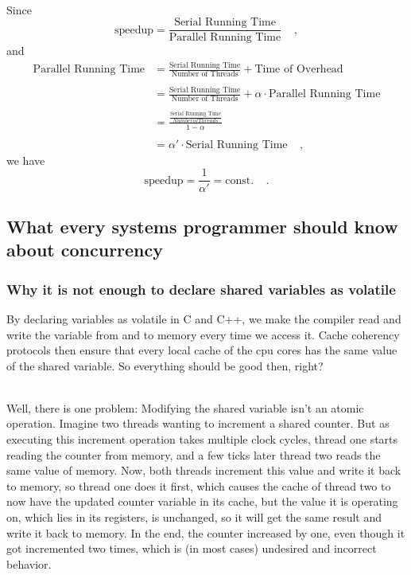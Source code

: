 \documentclass[../../main.tex]{subfiles}
\begin{document}
~\\
Since
\[
    \text{speedup} = \frac{\text{Serial Running Time}}{\text{Parallel Running Time}} \ \ \ \ \ ,
\]
and
\begin{align*}
    \text{Parallel Running Time} &= \frac{\text{Serial Running Time}}{\text{Number of Threads}} + \text{Time of Overhead} \\ \\
    &= \frac{\text{Serial Running Time}}{\text{Number of Threads}} + \alpha \cdot \text{Parallel Running Time} \\ \\
    &= \frac{\frac{\text{Serial Running Time}}{Number of Threads}}{1-\alpha} \\ \\
    &= \alpha' \cdot \text{Serial Running Time} \ \ \ \ \ ,
\end{align*}
we have
\[
    \text{speedup} = \frac{1}{\alpha'} = \text{const.} \ \ \ \ \ .
\]


\newpage
\subsection{What every systems programmer should know about concurrency}
\subsubsection{Why it is not enough to declare shared variables as volatile}
By declaring variables as volatile in C and C++, we make the compiler read and write the variable from and to memory every time we access it.
Cache coherency protocols then ensure that every local cache of the cpu cores has the same value of the shared variable.
So everything should be good then, right?

~\\
Well, there is one problem: Modifying the shared variable isn't an atomic operation.
Imagine two threads wanting to increment a shared counter.
But as executing this increment operation takes multiple clock cycles, thread one starts reading the counter from memory, and a few ticks later thread two reads the same value of memory.
Now, both threads increment this value and write it back to memory, so thread one does it first, which causes the cache of thread two to now have the updated counter variable in its cache, but the value it is operating on, which lies in its registers, is unchanged, so it will get the same result and write it back to memory.
In the end, the counter increased by one, even though it got incremented two times, which is (in most cases) undesired and incorrect behavior.
\end{document}
